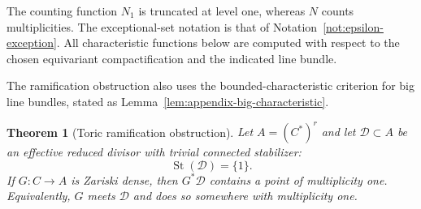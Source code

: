 \documentclass[11pt]{amsart}
\def\CC{C}%
\numberwithin{equation}{section}
\newtheorem{theorem}{Theorem}[section]
\theoremstyle{definition}
\theoremstyle{remark}
\newcommand{\CC}{\mathbb C}
\newcommand{\St}{\operatorname{St}}
\begin{document}
The counting function $N_1$ is truncated at level one, whereas $N$ counts multiplicities.  The exceptional-set notation is that of Notation~\ref{not:epsilon-exception}.  All characteristic functions below are computed with respect to the chosen equivariant compactification and the indicated line bundle.

The ramification obstruction also uses the bounded-characteristic criterion for big line bundles, stated as Lemma~\ref{lem:appendix-big-characteristic}.

\begin{theorem}[Toric ramification obstruction]\label{thm:toric-ramification}
Let $A=(\CC^*)^r$ and let $\mathcal D\subset A$ be an effective reduced divisor with trivial connected stabilizer:
\[
\St(\mathcal D)=\{1\}.
\]
If $G:\CC\to A$ is Zariski dense, then $G^*\mathcal D$ contains a point of multiplicity one.  Equivalently, $G$ meets $\mathcal D$ and does so somewhere with multiplicity one.
\end{theorem}
\end{document}
